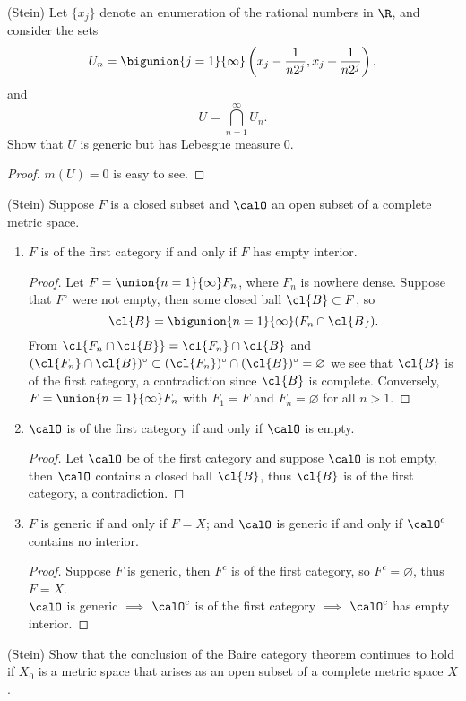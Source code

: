 \begin{problemset}
\item (Stein) Let $\{x_j\}$ denote an enumeration of the rational numbers in $\R$, and consider the sets
$$U_n = \bigunion{j=1}{\infty}\left(x_j-\frac{1}{n2^j}, x_j+\frac{1}{n2^j}\right),$$
and $$U=\bigcap_{n=1}^\infty U_n.$$
Show that $U$ is generic but has Lebesgue measure $0$. 
\begin{proof}
    $m(U)=0$ is easy to see.
\end{proof}
\item (Stein) Suppose $F$ is a closed subset and $\calO$ an open subset of a complete metric space.
\begin{enumerate}
    \item $F$ is of the first category if and only if $F$ has empty interior.
    \begin{proof}
    Let $F=\union{n=1}{\infty}F_n$, where $F_n$ is nowhere dense. Suppose that $F^\circ$ were not empty, then some closed ball $\cl{B} \subset F$, so 
    $$\cl{B} = \bigunion{n=1}{\infty} (F_n \cap \cl{B}).$$
    From $\cl{F_n \cap \cl{B}} = \cl{F_n} \cap \cl{B}$ and $(\cl{F_n} \cap \cl{B})^\circ \subset (\cl{F_n})^\circ \cap (\cl{B})^\circ = \varnothing$ we see that 
    $\cl{B}$ is of the first category, a contradiction since $\cl{B}$ is complete. 
    Conversely, $F = \union{n=1}{\infty}F_n$ with $F_1=F$ and $F_n=\varnothing$ for all $n>1$.
    \end{proof}
    \item $\calO$ is of the first category if and only if $\calO$ is empty.
    \begin{proof}
    Let $\calO$ be of the first category and suppose $\calO$ is not empty, then $\calO$ contains a closed ball $\cl{B}$, thus $\cl{B}$ is of the first category, a contradiction.
    \end{proof}
    \item $F$ is generic if and only if $F=X$; and $\calO$ is generic if and only if $\calO^c$ contains no interior.
    \begin{proof}
    Suppose $F$ is generic, then $F^c$ is of the first category, so $F^c=\varnothing$, thus $F=X$. \\
    $\calO$ is generic $\implies$ $\calO^c$ is of the first category $\implies$ $\calO^c$ has empty interior.
    \end{proof}
\end{enumerate}
\item (Stein) Show that the conclusion of the Baire category theorem continues to hold if $X_0$ is a metric space that arises as an open subset of a complete metric space $X$.

\end{problemset}
